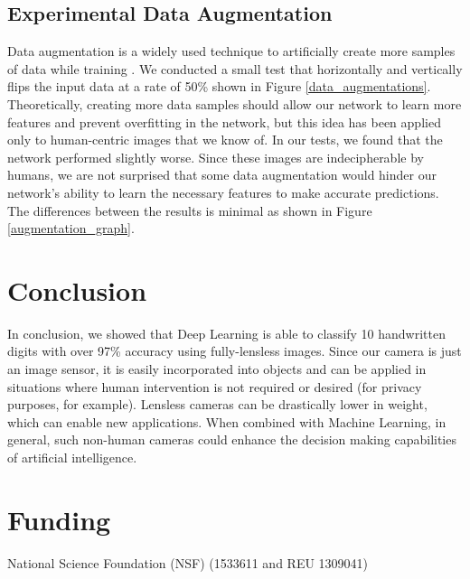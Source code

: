 \documentclass{osa-article}
\begin{document}
\subsection{Experimental Data Augmentation}
Data augmentation is a widely used technique to artificially create more samples of data while training \cite{DBLP:journals/corr/WongGSM16}. We conducted a small test that horizontally and vertically flips the input data at a rate of 50\% shown in Figure \ref{data_augmentations}. Theoretically, creating more data samples should allow our network to learn more features and prevent overfitting in the network, but this idea has been applied only to human-centric images that we know of. In our tests, we found that the network performed slightly worse. Since these images are indecipherable by humans, we are not surprised that some data augmentation would hinder our network's ability to learn the necessary features to make accurate predictions. The differences between the results is minimal as shown in Figure \ref{augmentation_graph}.
%
\section{Conclusion}
In conclusion, we showed that Deep Learning is able to classify 10 handwritten digits with over 97\% accuracy using fully-lensless images. Since our camera is just an image sensor, it is easily incorporated into objects and can be applied in situations where human intervention is not required or desired (for privacy purposes, for example). Lensless cameras can be drastically lower in weight, which can enable new applications. When combined with Machine Learning, in general, such non-human cameras could enhance the decision making capabilities of artificial intelligence.
\section*{Funding}
 National Science Foundation (NSF) (1533611 and REU 1309041)
%

\end{document}
